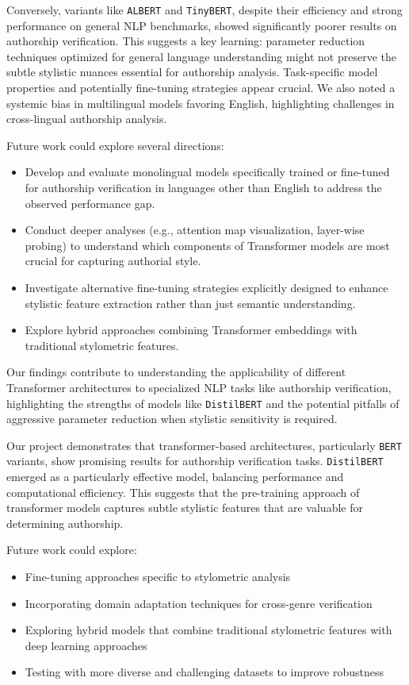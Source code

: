 \documentclass[12pt,a4paper]{article}
\begin{document}
Conversely, variants like \texttt{ALBERT} and \texttt{TinyBERT}, despite their efficiency and strong performance on general NLP benchmarks, showed significantly poorer results on authorship verification. This suggests a key learning: parameter reduction techniques optimized for general language understanding might not preserve the subtle stylistic nuances essential for authorship analysis. Task-specific model properties and potentially fine-tuning strategies appear crucial. We also noted a systemic bias in multilingual models favoring English, highlighting challenges in cross-lingual authorship analysis.

Future work could explore several directions:
\begin{itemize}
    \item Develop and evaluate monolingual models specifically trained or fine-tuned for authorship verification in languages other than English to address the observed performance gap.
    \item Conduct deeper analyses (e.g., attention map visualization, layer-wise probing) to understand which components of Transformer models are most crucial for capturing authorial style.
    \item Investigate alternative fine-tuning strategies explicitly designed to enhance stylistic feature extraction rather than just semantic understanding.
    \item Explore hybrid approaches combining Transformer embeddings with traditional stylometric features.
\end{itemize}
Our findings contribute to understanding the applicability of different Transformer architectures to specialized NLP tasks like authorship verification, highlighting the strengths of models like \texttt{DistilBERT} and the potential pitfalls of aggressive parameter reduction when stylistic sensitivity is required.

Our project demonstrates that transformer-based architectures, particularly \texttt{BERT} variants, show promising results for authorship verification tasks. \texttt{DistilBERT} emerged as a particularly effective model, balancing performance and computational efficiency. This suggests that the pre-training approach of transformer models captures subtle stylistic features that are valuable for determining authorship.

Future work could explore:
\begin{itemize}
    \item Fine-tuning approaches specific to stylometric analysis
    \item Incorporating domain adaptation techniques for cross-genre verification
    \item Exploring hybrid models that combine traditional stylometric features with deep learning approaches
    \item Testing with more diverse and challenging datasets to improve robustness
\end{itemize}
\end{document}
